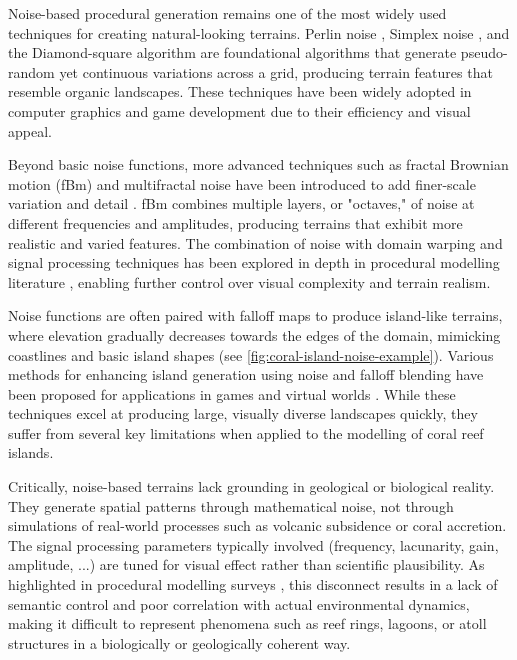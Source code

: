 Noise-based procedural generation remains one of the most widely used techniques for creating natural-looking terrains. Perlin noise \cite{Perlin1985}, Simplex noise \cite{Perlin2001}, and the Diamond-square algorithm \cite{Fournier1982} are foundational algorithms that generate pseudo-random yet continuous variations across a grid, producing terrain features that resemble organic landscapes. These techniques have been widely adopted in computer graphics and game development due to their efficiency and visual appeal.

Beyond basic noise functions, more advanced techniques such as fractal Brownian motion (fBm) and multifractal noise have been introduced to add finer-scale variation and detail \cite{Musgrave1989,Ebert2003}. fBm combines multiple layers, or "octaves," of noise at different frequencies and amplitudes, producing terrains that exhibit more realistic and varied features. The combination of noise with domain warping and signal processing techniques has been explored in depth in procedural modelling literature \cite{Reinhard2010}, enabling further control over visual complexity and terrain realism.

Noise functions are often paired with falloff maps to produce island-like terrains, where elevation gradually decreases towards the edges of the domain, mimicking coastlines and basic island shapes (see \cref{fig:coral-island-noise-example}). Various methods for enhancing island generation using noise and falloff blending have been proposed for applications in games and virtual worlds \cite{Olsen2004}. While these techniques excel at producing large, visually diverse landscapes quickly, they suffer from several key limitations when applied to the modelling of coral reef islands.

Critically, noise-based terrains lack grounding in geological or biological reality. They generate spatial patterns through mathematical noise, not through simulations of real-world processes such as volcanic subsidence or coral accretion. The signal processing parameters typically involved (frequency, lacunarity, gain, amplitude, ...) are tuned for visual effect rather than scientific plausibility. As highlighted in procedural modelling surveys \cite{Smelik2009,Galin2019}, this disconnect results in a lack of semantic control and poor correlation with actual environmental dynamics, making it difficult to represent phenomena such as reef rings, lagoons, or atoll structures in a biologically or geologically coherent way.

